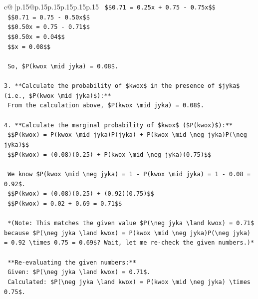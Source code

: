 \documentclass{article}
\begin{document}
{\begin{supertabular}{c@{$\;$}|p{.15\linewidth}@{}p{.15\linewidth}p{.15\linewidth}p{.15\linewidth}p{.15\linewidth}p{.15\linewidth}}
{{{\texttt{    \$\$0.71 = 0.25x + 0.75 {-} 0.75x\$\$} \\
\texttt{    \$\$0.71 = 0.75 {-} 0.50x\$\$} \\
\texttt{    \$\$0.50x = 0.75 {-} 0.71\$\$} \\
\texttt{    \$\$0.50x = 0.04\$\$} \\
\texttt{    \$\$x = 0.08\$\$} \\
\\ 
\texttt{    So, \$P(kwox \textbackslash{}mid jyka) = 0.08\$.} \\
\\ 
\texttt{3.  **Calculate the probability of \$kwox\$ in the presence of \$jyka\$ (i.e., \$P(kwox \textbackslash{}mid jyka)\$):**} \\
\texttt{    From the calculation above, \$P(kwox \textbackslash{}mid jyka) = 0.08\$.} \\
\\ 
\texttt{4.  **Calculate the marginal probability of \$kwox\$ (\$P(kwox)\$):**} \\
\texttt{    \$\$P(kwox) = P(kwox \textbackslash{}mid jyka)P(jyka) + P(kwox \textbackslash{}mid \textbackslash{}neg jyka)P(\textbackslash{}neg jyka)\$\$} \\
\texttt{    \$\$P(kwox) = (0.08)(0.25) + P(kwox \textbackslash{}mid \textbackslash{}neg jyka)(0.75)\$\$} \\
\\ 
\texttt{    We know \$P(kwox \textbackslash{}mid \textbackslash{}neg jyka) = 1 {-} P(kwox \textbackslash{}mid jyka) = 1 {-} 0.08 = 0.92\$.} \\
\texttt{    \$\$P(kwox) = (0.08)(0.25) + (0.92)(0.75)\$\$} \\
\texttt{    \$\$P(kwox) = 0.02 + 0.69 = 0.71\$\$} \\
\\ 
\texttt{    *(Note: This matches the given value \$P(\textbackslash{}neg jyka \textbackslash{}land kwox) = 0.71\$ because \$P(\textbackslash{}neg jyka \textbackslash{}land kwox) = P(kwox \textbackslash{}mid \textbackslash{}neg jyka)P(\textbackslash{}neg jyka) = 0.92 \textbackslash{}times 0.75 = 0.69\$? Wait, let me re{-}check the given numbers.)*} \\
\\ 
\texttt{    **Re{-}evaluating the given numbers:**} \\
\texttt{    Given: \$P(\textbackslash{}neg jyka \textbackslash{}land kwox) = 0.71\$.} \\
\texttt{    Calculated: \$P(\textbackslash{}neg jyka \textbackslash{}land kwox) = P(kwox \textbackslash{}mid \textbackslash{}neg jyka) \textbackslash{}times 0.75\$.} \\
}}}
\end{supertabular}}
\end{document}
